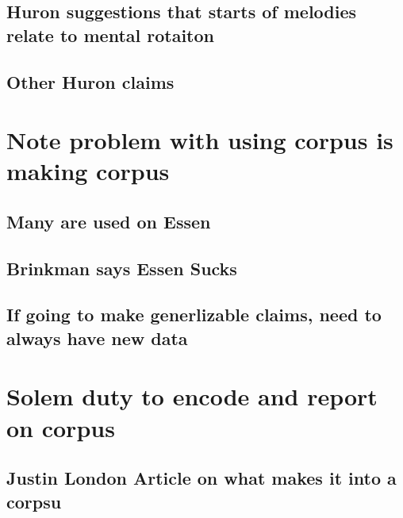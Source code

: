 \documentclass[]{book}
\theoremstyle{definition}
\theoremstyle{definition}
\theoremstyle{definition}
\theoremstyle{remark}
\begin{document}
\hypertarget{huron-suggestions-that-starts-of-melodies-relate-to-mental-rotaiton}{%
\subsection{Huron suggestions that starts of melodies relate to mental
rotaiton}\label{huron-suggestions-that-starts-of-melodies-relate-to-mental-rotaiton}}

\hypertarget{other-huron-claims}{%
\subsection{Other Huron claims}\label{other-huron-claims}}

\hypertarget{note-problem-with-using-corpus-is-making-corpus}{%
\section{Note problem with using corpus is making
corpus}\label{note-problem-with-using-corpus-is-making-corpus}}

\hypertarget{many-are-used-on-essen}{%
\subsection{Many are used on Essen}\label{many-are-used-on-essen}}

\hypertarget{brinkman-says-essen-sucks}{%
\subsection{Brinkman says Essen Sucks}\label{brinkman-says-essen-sucks}}

\hypertarget{if-going-to-make-generlizable-claims-need-to-always-have-new-data}{%
\subsection{If going to make generlizable claims, need to always have
new
data}\label{if-going-to-make-generlizable-claims-need-to-always-have-new-data}}

\hypertarget{solem-duty-to-encode-and-report-on-corpus}{%
\section{Solem duty to encode and report on
corpus}\label{solem-duty-to-encode-and-report-on-corpus}}

\hypertarget{justin-london-article-on-what-makes-it-into-a-corpsu}{%
\subsection{Justin London Article on what makes it into a
corpsu}\label{justin-london-article-on-what-makes-it-into-a-corpsu}}
\end{document}
